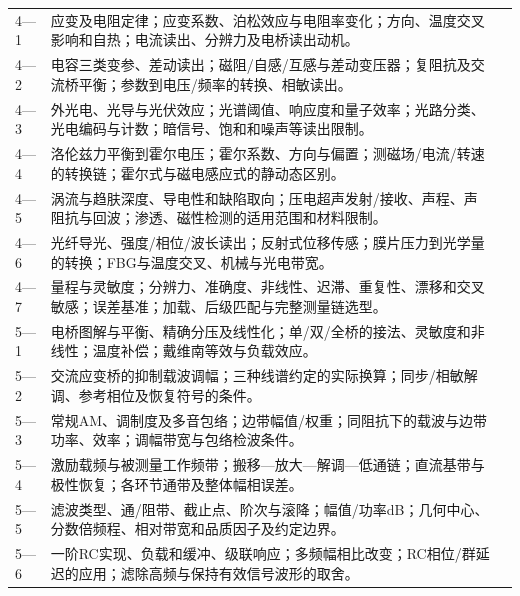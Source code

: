 \begin{longtable}{@{}p{1.05cm}p{12.25cm}r@{}}
4—1 & 应变及电阻定律；应变系数、泊松效应与电阻率变化；方向、温度交叉影响和自热；电流读出、分辨力及电桥读出动机。 & \pageref{kn:4-1}\\
4—2 & 电容三类变参、差动读出；磁阻/自感/互感与差动变压器；复阻抗及交流桥平衡；参数到电压/频率的转换、相敏读出。 & \pageref{kn:4-2}\\
4—3 & 外光电、光导与光伏效应；光谱阈值、响应度和量子效率；光路分类、光电编码与计数；暗信号、饱和和噪声等读出限制。 & \pageref{kn:4-3}\\
4—4 & 洛伦兹力平衡到霍尔电压；霍尔系数、方向与偏置；测磁场/电流/转速的转换链；霍尔式与磁电感应式的静动态区别。 & \pageref{kn:4-4}\\
4—5 & 涡流与趋肤深度、导电性和缺陷取向；压电超声发射/接收、声程、声阻抗与回波；渗透、磁性检测的适用范围和材料限制。 & \pageref{kn:4-5}\\
4—6 & 光纤导光、强度/相位/波长读出；反射式位移传感；膜片压力到光学量的转换；FBG与温度交叉、机械与光电带宽。 & \pageref{kn:4-6}\\
4—7 & 量程与灵敏度；分辨力、准确度、非线性、迟滞、重复性、漂移和交叉敏感；误差基准；加载、后级匹配与完整测量链选型。 & \pageref{kn:4-7}\\
5—1 & 电桥图解与平衡、精确分压及线性化；单/双/全桥的接法、灵敏度和非线性；温度补偿；戴维南等效与负载效应。 & \pageref{kn:5-1}\\
5—2 & 交流应变桥的抑制载波调幅；三种线谱约定的实际换算；同步/相敏解调、参考相位及恢复符号的条件。 & \pageref{kn:5-2}\\
5—3 & 常规AM、调制度及多音包络；边带幅值/权重；同阻抗下的载波与边带功率、效率；调幅带宽与包络检波条件。 & \pageref{kn:5-3}\\
5—4 & 激励载频与被测量工作频带；搬移—放大—解调—低通链；直流基带与极性恢复；各环节通带及整体幅相误差。 & \pageref{kn:5-4}\\
5—5 & 滤波类型、通/阻带、截止点、阶次与滚降；幅值/功率dB；几何中心、分数倍频程、相对带宽和品质因子及约定边界。 & \pageref{kn:5-5}\\
5—6 & 一阶RC实现、负载和缓冲、级联响应；多频幅相比改变；RC相位/群延迟的应用；滤除高频与保持有效信号波形的取舍。 & \pageref{kn:5-6}\\
\end{longtable}
\endgroup
